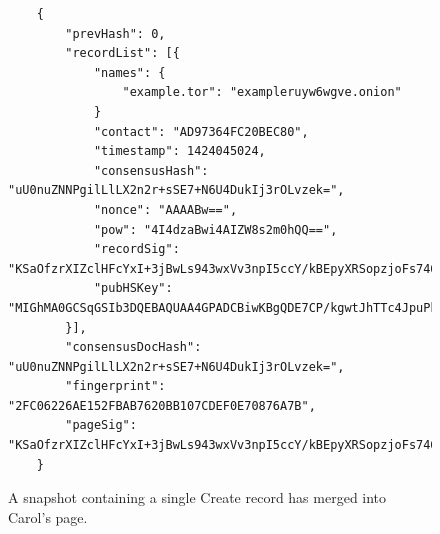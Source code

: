 \begin{figure}
	\begin{lstlisting}
	{
		"prevHash": 0,
		"recordList": [{
			"names": {
				"example.tor": "exampleruyw6wgve.onion"
			}
			"contact": "AD97364FC20BEC80",
			"timestamp": 1424045024,
			"consensusHash": "uU0nuZNNPgilLlLX2n2r+sSE7+N6U4DukIj3rOLvzek=",
			"nonce": "AAAABw==",
			"pow": "4I4dzaBwi4AIZW8s2m0hQQ==",
			"recordSig": 	"KSaOfzrXIZclHFcYxI+3jBwLs943wxVv3npI5ccY/kBEpyXRSopzjoFs746n0tJqUpdY4Kbe6DBwERaN7ELmSSK9Pu6q8QeKzNAh+QOnKl0fKBN7fqowjkQ3ktFkR0Vuox9WrrbNTMa4+up0Np52hlbKA3zSRz4fbR9NVlh6uuQ=",
			"pubHSKey": "MIGhMA0GCSqGSIb3DQEBAQUAA4GPADCBiwKBgQDE7CP/kgwtJhTTc4JpuPkvA7Ln9wgc+fgTKgkyUp1zusxgUAn1c1MGx4YhO42KPB7dyZOf3pcRk94XsYFY1ULkF2+tf9KdNe7GFzJyMFCQENnUcVXbcwLH4vAeiGK7R/nScbCbyc9LT+VE1fbKchTL1QzLVBLqJTxhR+9YPi8x+QIFAdZ8BJs="
		}],
		"consensusDocHash": "uU0nuZNNPgilLlLX2n2r+sSE7+N6U4DukIj3rOLvzek=",
		"fingerprint": "2FC06226AE152FBAB7620BB107CDEF0E70876A7B",
		"pageSig": "KSaOfzrXIZclHFcYxI+3jBwLs943wxVv3npI5ccY/kBEpyXRSopzjoFs746n0tJqUpdY4Kbe6DBwERaN7ELmSSK9Pu6q8QeKzNAh+QOnKl0fKBN7fqowjkQ3ktFkR0Vuox9WrrbNTMa4+up0Np52hlbKA3zSRz4fbR9NVlh6uuQ="
	}
	\end{lstlisting}
	\caption{A snapshot containing a single Create record has merged into Carol's page.}
	\label{fig:recordInSS}
\end{figure}



